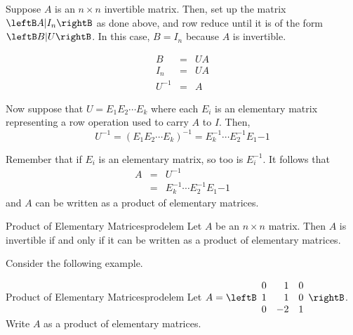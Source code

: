 Suppose $A$ is an $n \times n$ invertible matrix. Then, set up the matrix $\leftB A | I_n \rightB$ as done above, and row reduce until it is of the form $\leftB B | U \rightB$. In this case, $B = I_n$ because $A$ is invertible. 

\begin{eqnarray*}
B &=& UA \\
I_n &=& UA \\
U^{-1} &=& A 
\end{eqnarray*}

Now suppose that $U = E_1 E_2 \cdots E_k$ where each $E_i$ is an elementary matrix representing a row operation used to carry $A$ to $I$. Then, 
\[
U^{-1} = \left( E_1 E_2 \cdots E_k \right) ^{-1}  =  E_k^{-1} \cdots E_2^{-1} E_1{-1} 
\]

Remember that if $E_i$ is an elementary matrix, so too is $E_i^{-1}$. 
It follows that 
\begin{eqnarray*}
A&=& U^{-1} \\
&=&  E_k^{-1} \cdots E_2^{-1} E_1{-1}
\end{eqnarray*}
and $A$ can be written as a product of elementary matrices. 

\begin{theorem}{Product of Elementary Matrices}{prodelem}
Let $A$ be an $n \times n$ matrix. Then $A$ is invertible if and only if it can be written as a product of elementary matrices.
\end{theorem}

Consider the following example.

\begin{example}{Product of Elementary Matrices}{prodelem}
Let $A = \leftB
\begin{array}{rrr}
0 & 1 & 0 \\
1 & 1 & 0 \\
0 & -2 & 1 
\end{array} \rightB$. 
Write $A$ as a product of elementary matrices. 
\end{example}

